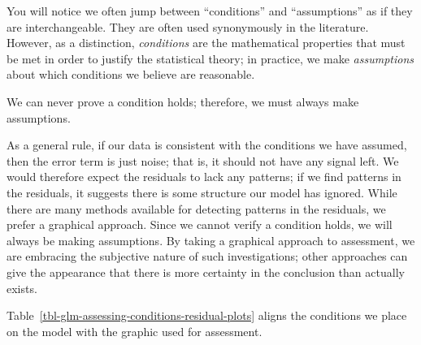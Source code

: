 \documentclass[
  letterpaper,
  DIV=11,
  numbers=noendperiod]{scrreprt}
\theoremstyle{definition}
\theoremstyle{definition}
\theoremstyle{remark}
\begin{document}
\begin{tcolorbox}[enhanced jigsaw, bottomrule=.15mm, titlerule=0mm, bottomtitle=1mm, colback=white, coltitle=black, rightrule=.15mm, leftrule=.75mm, toprule=.15mm, toptitle=1mm, left=2mm, opacityback=0, colframe=quarto-callout-note-color-frame, breakable, title=\textcolor{quarto-callout-note-color}{\faInfo}\hspace{0.5em}{Note}, arc=.35mm, colbacktitle=quarto-callout-note-color!10!white, opacitybacktitle=0.6]

You will notice we often jump between ``conditions'' and ``assumptions''
as if they are interchangeable. They are often used synonymously in the
literature. However, as a distinction, \emph{conditions} are the
mathematical properties that must be met in order to justify the
statistical theory; in practice, we make \emph{assumptions} about which
conditions we believe are reasonable.

We can never prove a condition holds; therefore, we must always make
assumptions.

\end{tcolorbox}

As a general rule, if our data is consistent with the conditions we have
assumed, then the error term is just noise; that is, it should not have
any signal left. We would therefore expect the residuals to lack any
patterns; if we find patterns in the residuals, it suggests there is
some structure our model has ignored. While there are many methods
available for detecting patterns in the residuals, we prefer a graphical
approach. Since we cannot verify a condition holds, we will always be
making assumptions. By taking a graphical approach to assessment, we are
embracing the subjective nature of such investigations; other approaches
can give the appearance that there is more certainty in the conclusion
than actually exists.

Table~\ref{tbl-glm-assessing-conditions-residual-plots} aligns the
conditions we place on the model with the graphic used for assessment.
\end{document}
